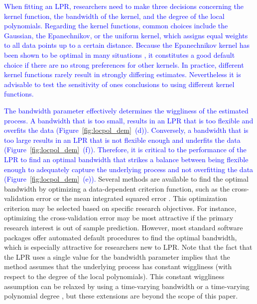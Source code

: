 \documentclass[man, floatsintext]{apa7}
\begin{document}
\textcolor{blue}{
  When fitting an LPR, researchers need to make three decisions concerning
  the kernel function, the bandwidth of the kernel, and the degree of the local
  polynomials. Regarding the kernel functions, common choices include the
  Gaussian, the Epanechnikov, or the uniform kernel, which assigns equal
  weights to all data points up to a certain distance. Because the Epanechnikov
  kernel has been shown to be optimal in many situations
  \parencite{fan_local_1997}, it constitutes a good default choice if there are
  no strong preferences for other kernels. In practice, different kernel
  functions rarely result in strongly differing estimates. Nevertheless it is
  advisable to test the sensitivity of ones conclusions to using different
  kernel functions.
}

\textcolor{blue}{
  The bandwidth parameter effectively determines the wiggliness of the
  estimated process. A bandwidth that is too small, results in an LPR that is
  too flexible and overfits the data (Figure~\ref{fig:locpol_dem}~(d)).
  Conversely, a bandwidth that is too large results in an LPR that is not
  flexible enough and underfits the data (Figure~\ref{fig:locpol_dem}~(f)).
  Therefore, it is critical to the performance of the LPR to find an optimal
  bandwidth that strikes a balance between being flexible enough to adequately
  capture the underlying process and not overfitting the data
  (Figure~\ref{fig:locpol_dem}~(e)).} Several methods are available to find
the
optimal bandwidth by optimizing a data-dependent criterion function, such as
the cross-validation error or the mean integrated squared error
\parencite{kohler_review_2014, debruyne_model_2008}. This optimization
criterion may be selected based on specific research objectives. For instance,
optimizing the cross-validation error may be most attractive if the primary
research interest is out of sample prediction. However, most standard software
packages offer automated default procedures to find the optimal bandwidth,
which is especially attractive for researchers new to LPR\@. Note that the fact
that the LPR uses a single value for the bandwidth parameter implies that the
method assumes that the underlying process has constant wiggliness (with
respect to the degree of the local polynomials). This
constant wiggliness assumption can be relaxed by using a time-varying bandwidth
\parencite{fan_data-driven_1995} or a time-varying polynomial degree
\parencite{fan_adaptive_1995}, but these extensions are beyond the scope of
this paper.
\end{document}
